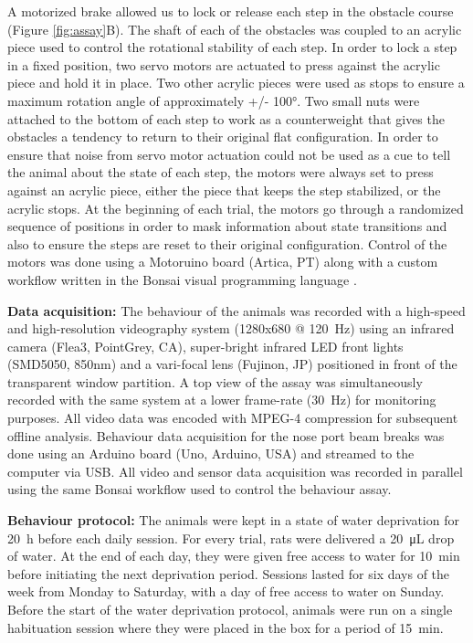A motorized brake allowed us to lock or release each step in the obstacle course (Figure \ref{fig:assay}B). The shaft of each of the obstacles was coupled to an acrylic piece used to control the rotational stability of each step. In order to lock a step in a fixed position, two servo motors are actuated to press against the acrylic piece and hold it in place. Two other acrylic pieces were used as stops to ensure a maximum rotation angle of approximately +/- \ang{100}. Two small nuts were attached to the bottom of each step to work as a counterweight that gives the obstacles a tendency to return to their original flat configuration. In order to ensure that noise from servo motor actuation could not be used as a cue to tell the animal about the state of each step, the motors were always set to press against an acrylic piece, either the piece that keeps the step stabilized, or the acrylic stops. At the beginning of each trial, the motors go through a randomized sequence of positions in order to mask information about state transitions and also to ensure the steps are reset to their original configuration. Control of the motors was done using a Motoruino board (Artica, PT) along with a custom workflow written in the Bonsai visual programming language \cite{Lopes2015a}.

\textbf{Data acquisition:} The behaviour of the animals was recorded with a high-speed and high-resolution videography system (1280x680 @ \SI{120}{\hertz}) using an infrared camera (Flea3, PointGrey, CA), super-bright infrared LED front lights (SMD5050, 850nm) and a vari-focal lens (Fujinon, JP) positioned in front of the transparent window partition. A top view of the assay was simultaneously recorded with the same system at a lower frame-rate (\SI{30}{\hertz}) for monitoring purposes. All video data was encoded with MPEG-4 compression for subsequent offline analysis. Behaviour data acquisition for the nose port beam breaks was done using an Arduino board (Uno, Arduino, USA) and streamed to the computer via USB. All video and sensor data acquisition was recorded in parallel using the same Bonsai workflow used to control the behaviour assay.

\textbf{Behaviour protocol:} The animals were kept in a state of water deprivation for \SI{20}{\hour} before each daily session. For every trial, rats were delivered a \SI{20}{\micro\liter} drop of water. At the end of each day, they were given free access to water for \SI{10}{\minute} before initiating the next deprivation period. Sessions lasted for six days of the week from Monday to Saturday, with a day of free access to water on Sunday. Before the start of the water deprivation protocol, animals were run on a single habituation session where they were placed in the box for a period of \SI{15}{\minute}.

